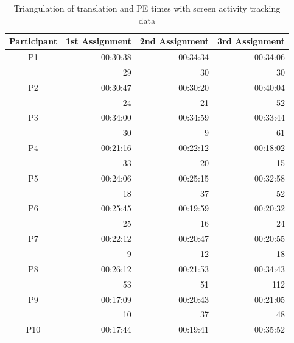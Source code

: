 \begin{table}[ht]
\caption{Triangulation of translation and PE times with screen activity tracking data}
    \centering
    \begin{tabular}{crrr} \lsptoprule
      \textbf{Participant} & \textbf{1st Assignment} & \textbf{2nd Assignment} & \textbf{3rd Assignment} \\
\midrule
       P1 & \cellcolor{yellow!25}00:30:38 & \cellcolor{red!25}00:34:34 & 00:34:06 \\
          & \cellcolor{yellow!25}29 & \cellcolor{red!25}30 & \cellcolor{red!25}30 \\
       P2 & 00:30:47 & \cellcolor{yellow!25}00:30:20 & \cellcolor{red!25}00:40:04 \\
          & 24 & \cellcolor{yellow!25}21 & \cellcolor{red!25}52 \\
       P3 & 00:34:00 & \cellcolor{red!25}00:34:59 & \cellcolor{yellow!25}00:33:44 \\
          & 30 & \cellcolor{yellow!25}9 & \cellcolor{red!25}61  \\
       P4 & 00:21:16 & \cellcolor{red!25}00:22:12 & \cellcolor{yellow!25}00:18:02 \\
          & \cellcolor{red!25}33 & 20 & \cellcolor{yellow!25}15 \\
       P5 & \cellcolor{yellow!25}00:24:06 & 00:25:15 & \cellcolor{red!25}00:32:58 \\
          & \cellcolor{yellow!25}18 & 37 & \cellcolor{red!25}52 \\
       P6 & \cellcolor{red!25}00:25:45 & \cellcolor{yellow!25}00:19:59 & 00:20:32 \\ 
          & \cellcolor{red!25}25 & \cellcolor{yellow!25}16 & 24 \\
\midrule
       P7 & \cellcolor{red!25}00:22:12 & \cellcolor{yellow!25}00:20:47 & 00:20:55 \\
          & \cellcolor{yellow!25}9 & 12 & \cellcolor{red!25}18 \\
       P8 & 00:26:12 & \cellcolor{yellow!25}00:21:53 & \cellcolor{red!25}00:34:43 \\
          & 53 & \cellcolor{yellow!25}51 & \cellcolor{red!25}112 \\
       P9 & \cellcolor{yellow!25}00:17:09 & 00:20:43 & \cellcolor{red!25}00:21:05 \\
          & \cellcolor{yellow!25}10 & 37 & \cellcolor{red!25}48 \\
       P10 & \cellcolor{yellow!25}00:17:44 & 00:19:41 & \cellcolor{red!25}00:35:52 \\

\end{tabular}
\end{table}
